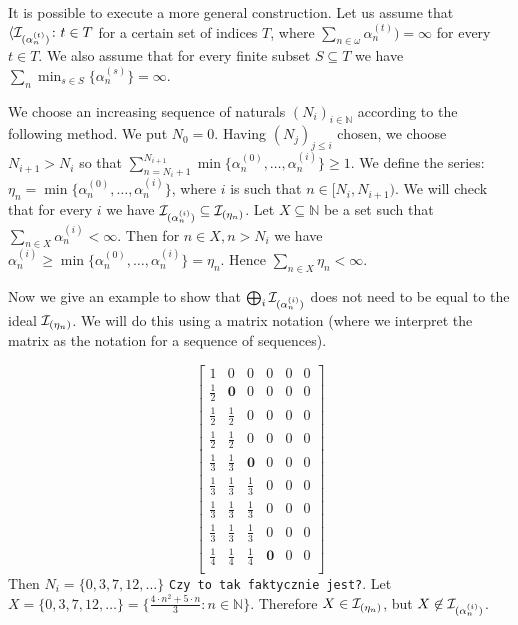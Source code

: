 \documentclass[12pt]{article}
\theoremstyle{plain}
\theoremstyle{definition}
\theoremstyle{remark}
\newcommand{\nnatural}{\mathbb{N}}
\newcommand{\cI}{{\cal I}}
\newcommand{\todo}[1]{{\tt #1}}
\begin{document}
It is possible to execute a more general construction. Let us assume that $\langle \cI_{(\alpha_n^{(t)})} \colon t \in T$ for a certain set of indices $T$, where $\sum_{n\in\omega}\alpha_n^{(t)}) = \infty$ for every $t\in T$. We also assume that for every finite subset $S \subseteq T$ we have $\sum_n \min_{s\in S} \{\alpha_n^{(s)}\} = \infty$.

We choose an increasing sequence of naturals $(N_i)_{i\in\nnatural}$ according to the following method. We put $N_0 = 0$. Having $(N_j)_{j \leq i}$ chosen, we choose $N_{i + 1} > N_{i}$ so that $\sum_{n = N_{i} + 1}^{N_{i+1}} \min\{\alpha_n^{(0)} , \ldots, \alpha_n^{(i)} \} \geq 1$. We define the series: $\eta_n = \min\{\alpha_n^{(0)} , \ldots, \alpha_n^{(i)}\}$, where $i$ is such that $n \in [N_i, N_{i+1})$. We will check that for every $i$ we have $\cI_{(\alpha_n^{(i)})} \subseteq \cI_{(\eta_n)}$. Let $X \subseteq \nnatural$ be a set such that $\sum_{n\in X} \alpha_n^{(i)} < \infty$. Then for $n\in X, n > N_i$ we have $\alpha_n^{(i)} \geq \min\{\alpha_n^{(0)} , \ldots, \alpha_n^{(i)}\} = \eta_n$. Hence $\sum_{n\in X}\eta_n < \infty$.

Now we give an example to show that $\bigoplus_{i}\cI_{(\alpha_n^{(i)})}$ does not need to be equal to the ideal $\cI_{(\eta_n)}$. We will do this using a matrix notation (where we interpret the matrix as the notation for a sequence of sequences).

\[
  \begin{bmatrix}
         1      &           0 & 0 & 0 & 0 & 0\\
    \frac{1}{2} &  \mathbf{0} & 0 & 0 & 0 & 0\\
    \frac{1}{2} & \frac{1}{2} & 0 & 0 & 0 & 0\\
    \frac{1}{2} & \frac{1}{2} & 0 & 0 & 0 & 0\\
    \frac{1}{3} & \frac{1}{3} & \mathbf{0} & 0 & 0 & 0\\
    \frac{1}{3} & \frac{1}{3} & \frac{1}{3} & 0 & 0 & 0\\
    \frac{1}{3} & \frac{1}{3} & \frac{1}{3} & 0 & 0 & 0\\
    \frac{1}{3} & \frac{1}{3} & \frac{1}{3} & 0 & 0 & 0\\
    \frac{1}{4} & \frac{1}{4} & \frac{1}{4} & \mathbf{0} & 0 & 0\\
  \end{bmatrix}
\]
Then $N_i = \{0, 3, 7, 12, \ldots \}$ \todo{Czy to tak faktycznie jest?}.
Let $X = \{0, 3, 7, 12, \ldots\} = \{ \frac{4 \cdot n^2 + 5 \cdot n}{3} \colon n \in\nnatural \}$.
Therefore $X \in \cI_{(\eta_n)}$, but $X\not\in\cI_{(\alpha_n^{(i)})}$.
\end{document}
